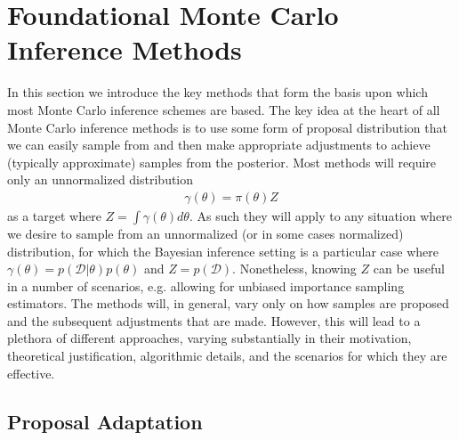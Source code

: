 
\section{Foundational Monte Carlo Inference Methods}
\label{sec:inf:foundation}

In this section we introduce the key methods that form
the basis upon which most Monte Carlo inference schemes are based.  The
key idea at the heart of all Monte Carlo inference methods is to use some form
of proposal distribution that we can easily sample from and then make
appropriate adjustments to achieve (typically approximate) samples from
the posterior.  Most methods will require only an unnormalized distribution
\begin{align}
\label{eq:inf:unnorm-target}
\gamma(\theta) = \pi(\theta)Z
\end{align}
as a target where $Z = \int \gamma(\theta) d\theta$.  As such they will apply to
any situation where we desire to sample from an unnormalized 
(or in some cases normalized) distribution, for which
the Bayesian inference setting is a particular case where
$\gamma(\theta) = p(\mathcal{D}|\theta)p(\theta)$ and $Z = p(\mathcal{D})$.
Nonetheless, knowing $Z$ can be useful in a number of scenarios, e.g. allowing
for unbiased importance sampling estimators.
The methods will, in general, vary only on how samples are proposed
and the subsequent adjustments that are made.  However, this will lead to a
plethora of different approaches, varying substantially in their motivation,
theoretical justification, algorithmic details, and the scenarios for which they
are effective.






\subsection{Proposal Adaptation}
\label{sec:inf:proposal-adapt}

